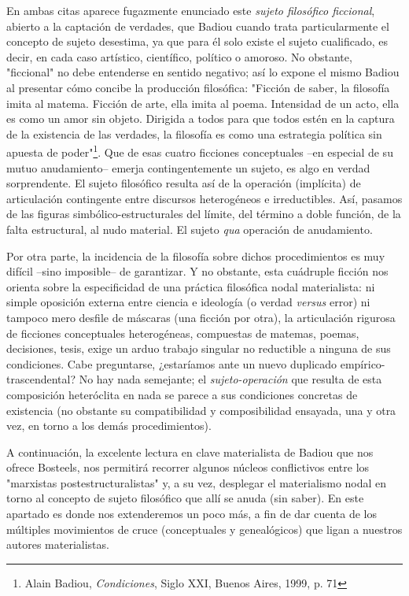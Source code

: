 \documentclass{book}
\begin{document}
En ambas citas aparece fugazmente enunciado este \emph{sujeto filosófico
ficcional}, abierto a la captación de verdades, que Badiou cuando trata
particularmente el concepto de sujeto desestima, ya que para él solo
existe el sujeto cualificado, es decir, en cada caso artístico,
científico, político o amoroso. No obstante, "ficcional" no debe
entenderse en sentido negativo; así lo expone el mismo Badiou al
presentar cómo concibe la producción filosófica: "Ficción de saber, la
filosofía imita al matema. Ficción de arte, ella imita al poema.
Intensidad de un acto, ella es como un amor sin objeto. Dirigida a todos
para que todos estén en la captura de la existencia de las verdades, la
filosofía es como una estrategia política sin apuesta de
poder"\footnote{Alain Badiou, \emph{Condiciones}, Siglo XXI, Buenos
  Aires, 1999, p. 71}. Que de esas cuatro ficciones conceptuales --en
especial de su mutuo anudamiento-- emerja contingentemente un sujeto, es
algo en verdad sorprendente. El sujeto filosófico resulta así de la
operación (implícita) de articulación contingente entre discursos
heterogéneos e irreductibles. Así, pasamos de las figuras
simbólico-estructurales del límite, del término a doble función, de la
falta estructural, al nudo material. El sujeto \emph{qua} operación de
anudamiento.

Por otra parte, la incidencia de la filosofía sobre dichos
procedimientos es muy difícil --sino imposible-- de garantizar. Y no
obstante, esta cuádruple ficción nos orienta sobre la especificidad de
una práctica filosófica nodal materialista: ni simple oposición externa
entre ciencia e ideología (o verdad \emph{versus} error) ni tampoco mero
desfile de máscaras (una ficción por otra), la articulación rigurosa de
ficciones conceptuales heterogéneas, compuestas de matemas, poemas,
decisiones, tesis, exige un arduo trabajo singular no reductible a
ninguna de sus condiciones. Cabe preguntarse, ¿estaríamos ante un nuevo
duplicado empírico-trascendental? No hay nada semejante; el
\emph{sujeto-operación} que resulta de esta composición heteróclita en
nada se parece a sus condiciones concretas de existencia (no obstante su
compatibilidad y composibilidad ensayada, una y otra vez, en torno a los
demás procedimientos).

A continuación, la excelente lectura en clave materialista de Badiou que
nos ofrece Bosteels, nos permitirá recorrer algunos núcleos conflictivos
entre los "marxistas postestructuralistas" y, a su vez, desplegar el
materialismo nodal en torno al concepto de sujeto filosófico que allí se
anuda (sin saber). En este apartado es donde nos extenderemos un poco
más, a fin de dar cuenta de los múltiples movimientos de cruce
(conceptuales y genealógicos) que ligan a nuestros autores
materialistas.
\end{document}
